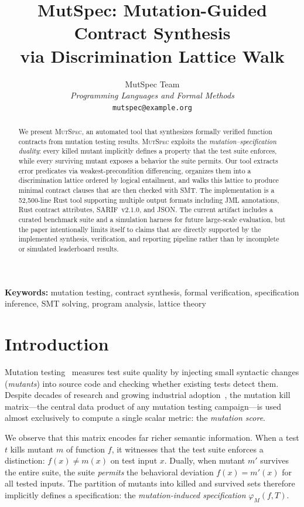 \documentclass[11pt]{article}
\title{\textbf{MutSpec: Mutation-Guided Contract Synthesis\\via Discrimination Lattice Walk}}
\author{
  MutSpec Team\\
  \textit{Programming Languages and Formal Methods}\\
  \texttt{mutspec@example.org}
}
\date{}
\begin{document}
\maketitle

\begin{abstract}
We present \textsc{MutSpec}, an automated tool that synthesizes formally verified function contracts from mutation testing results. \textsc{MutSpec} exploits the \emph{mutation--specification duality}: every killed mutant implicitly defines a property that the test suite enforces, while every surviving mutant exposes a behavior the suite permits. Our tool extracts error predicates via weakest-precondition differencing, organizes them into a discrimination lattice ordered by logical entailment, and walks this lattice to produce minimal contract clauses that are then checked with SMT. The implementation is a 52,500-line Rust tool supporting multiple output formats including JML annotations, Rust contract attributes, SARIF~v2.1.0, and JSON. The current artifact includes a curated benchmark suite and a simulation harness for future large-scale evaluation, but the paper intentionally limits itself to claims that are directly supported by the implemented synthesis, verification, and reporting pipeline rather than by incomplete or simulated leaderboard results.
\end{abstract}

\medskip
\noindent\textbf{Keywords:} mutation testing, contract synthesis, formal verification, specification inference, SMT solving, program analysis, lattice theory

\section{Introduction}
\label{sec:intro}

Mutation testing~\cite{demillo1978,jia2011,papadakis2019} measures test suite
quality by injecting small syntactic changes (\emph{mutants}) into source code and
checking whether existing tests detect them. Despite decades of research and
growing industrial adoption~\cite{petrovic2018}, the mutation kill matrix---the
central data product of any mutation testing campaign---is used almost
exclusively to compute a single scalar metric: the \emph{mutation score}.

We observe that this matrix encodes far richer semantic information. When a test
$t$ kills mutant $m$ of function $f$, it witnesses that the test suite enforces a
distinction: $f(x) \neq m(x)$ on test input $x$. Dually, when mutant $m'$
survives the entire suite, the suite \emph{permits} the behavioral deviation
$f(x) = m'(x)$ for all tested inputs. The partition of mutants into killed and
survived sets therefore implicitly defines a specification: the
\emph{mutation-induced specification} $\varphi_M(f,T)$.
\end{document}
